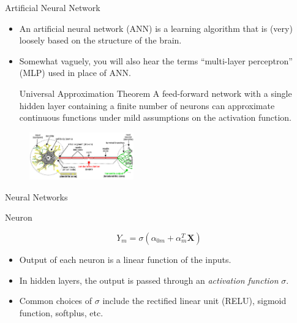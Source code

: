 \documentclass[aspectratio=169]{beamer}
\let \vec \mathbf
\begin{document}
\begin{frame}{Artificial Neural Network}
\begin{itemize}
        \item An artificial neural network (ANN) is a learning algorithm that is (very) loosely based on the structure of the brain.
        \item Somewhat vaguely, you will also hear the terms ``multi-layer perceptron'' (MLP) used in place of ANN.
        \begin{block}{Universal Approximation Theorem\cite{csajiApproximationArtificialNeural2001}}
        A feed-forward network with a single hidden layer containing a finite number of neurons can approximate continuous functions under mild assumptions on the activation function. 
        \end{block}
\end{itemize}
\begin{figure}
        \centering
        \includegraphics[width=0.4\textwidth]{figures/neuron.jpg}
    \end{figure}
\end{frame}


\begin{frame}{Neural Networks}
    
\end{frame}


\begin{frame}{Neuron}
\begin{figure}
\end{figure}
\begin{equation*}
    Y_m = \sigma(\alpha_{0m} + \alpha_{m}^T \vec{X})
\end{equation*}
    \begin{itemize}
        \item Output of each neuron is a linear function of the inputs.
        \item In hidden layers, the output is passed through an \textit{activation function} $\sigma$.
        \item Common choices of $\sigma$ include the rectified linear unit (RELU), sigmoid function, softplus, etc.
    \end{itemize}
\end{frame}
\end{document}
